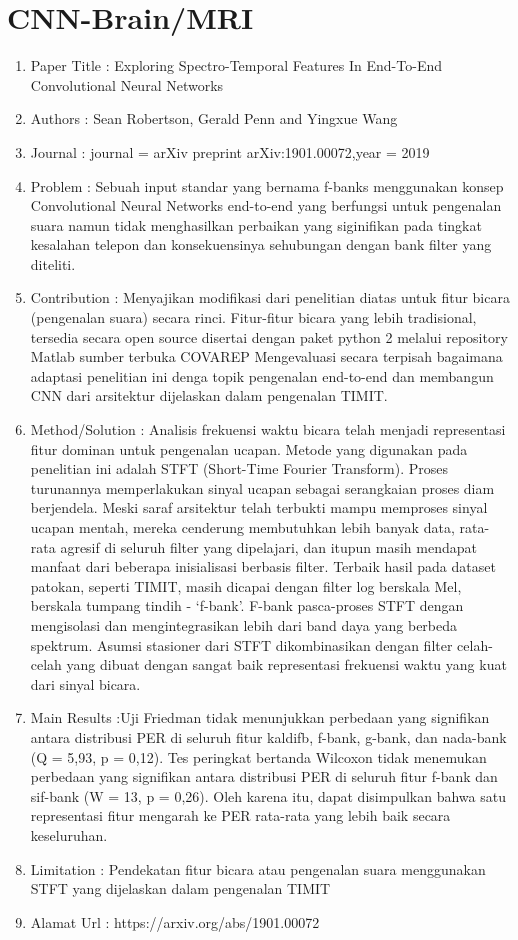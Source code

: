 \section{CNN-Brain/MRI}
\cite{robertson2019exploring}
\begin{enumerate}
\item Paper Title : Exploring Spectro-Temporal Features In End-To-End Convolutional Neural Networks
\item Authors :  Sean Robertson, Gerald Penn and Yingxue Wang
\item Journal : journal =  arXiv preprint arXiv:1901.00072,year = 2019
\item Problem : Sebuah input standar yang bernama f-banks menggunakan konsep Convolutional Neural Networks end-to-end yang berfungsi untuk pengenalan suara namun tidak menghasilkan perbaikan yang siginifikan pada tingkat kesalahan telepon dan  konsekuensinya sehubungan dengan bank filter yang diteliti.
\item Contribution : 
\subitem Menyajikan modifikasi dari penelitian diatas untuk fitur bicara (pengenalan suara) secara rinci. Fitur-fitur bicara yang lebih tradisional, tersedia secara open source disertai dengan paket python 2 melalui repository Matlab sumber terbuka COVAREP
\subitem Mengevaluasi secara terpisah bagaimana adaptasi penelitian ini denga topik pengenalan end-to-end dan membangun CNN dari arsitektur dijelaskan dalam pengenalan TIMIT.
\item Method/Solution : Analisis frekuensi waktu bicara telah menjadi representasi fitur dominan untuk pengenalan ucapan. Metode yang digunakan pada penelitian ini adalah STFT (Short-Time Fourier Transform). Proses turunannya memperlakukan sinyal ucapan sebagai serangkaian proses diam berjendela. Meski saraf arsitektur telah terbukti mampu memproses sinyal ucapan mentah, mereka cenderung membutuhkan lebih banyak data, rata-rata agresif di seluruh filter yang dipelajari, dan itupun masih mendapat manfaat dari beberapa inisialisasi berbasis filter. Terbaik hasil pada dataset patokan, seperti TIMIT, masih dicapai dengan filter log berskala Mel, berskala tumpang tindih - `f-bank'. F-bank pasca-proses STFT dengan mengisolasi dan mengintegrasikan lebih dari band daya yang berbeda spektrum. Asumsi stasioner dari STFT dikombinasikan dengan filter celah-celah yang dibuat dengan sangat baik representasi frekuensi waktu yang kuat dari sinyal bicara.
\item Main Results :Uji Friedman tidak menunjukkan perbedaan yang signifikan antara distribusi PER di seluruh fitur kaldifb, f-bank, g-bank, dan nada-bank (Q = 5,93, p = 0,12). Tes peringkat bertanda Wilcoxon tidak menemukan perbedaan yang signifikan antara distribusi PER di seluruh fitur f-bank dan sif-bank (W = 13, p = 0,26). Oleh karena itu, dapat disimpulkan bahwa satu representasi fitur mengarah ke PER rata-rata yang lebih baik secara keseluruhan.
\item Limitation : Pendekatan fitur bicara atau pengenalan suara menggunakan STFT yang dijelaskan dalam pengenalan TIMIT
\item Alamat Url : https://arxiv.org/abs/1901.00072
\end{enumerate}